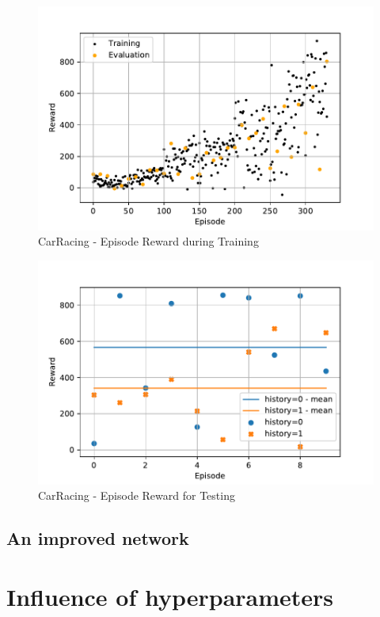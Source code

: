 \documentclass[
        a4paper,
        10pt,
        parskip = full,    %
    ]{scrartcl}
\begin{document}
\begin{figure}[H]
  \begin{center}
    \includegraphics{./images/CarRacing-v0/tb_train_eval_reward.pdf}
    \caption{CarRacing - Episode Reward during Training}
    \label{CarRacingTrainEvalReward}
  \end{center}
\end{figure}

\begin{figure}[H]
  \begin{center}
    \includegraphics{./images/CarRacing-v0/tb_test_reward.pdf}
    \caption{CarRacing - Episode Reward for Testing}
    \label{CarRacingTestReward}
  \end{center}
\end{figure}


\subsection{An improved network}


\section{Influence of hyperparameters}
\end{document}
